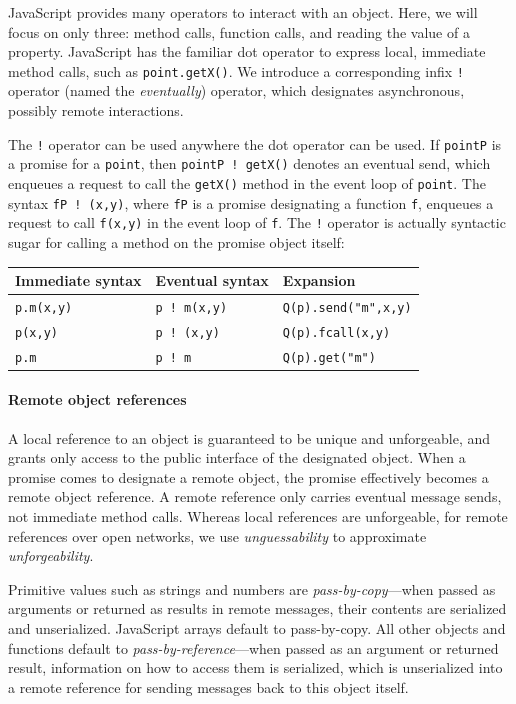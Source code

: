 \documentclass{llncs}
\begin{document}
JavaScript provides many operators to interact with an object. Here, we will focus on only three: method calls, function calls, and reading the value of a property. JavaScript has the familiar dot operator to express local, immediate method calls, such as {\tt point.getX()}. We introduce a corresponding infix {\tt !} operator (named the \emph{eventually}) operator, which designates asynchronous, possibly remote interactions.

The {\tt !} operator can be used anywhere the dot operator can be used. If {\tt pointP} is a promise for a {\tt point}, then {\tt pointP ! getX()} denotes an eventual send, which enqueues a request to call the {\tt getX()} method in the event loop of {\tt point}. The syntax {\tt fP ! (x,y)}, where {\tt fP} is a promise designating a function {\tt f}, enqueues a request to call {\tt f(x,y)} in the event loop of {\tt f}. The {\tt !} operator is actually syntactic sugar for calling a method on the promise object itself:

\begin{center}
  \begin{tabular}{ l | l | l }
  Immediate syntax & Eventual syntax & Expansion \\
  \hline
  {\tt p.m(x,y)} & {\tt p ! m(x,y)} & {\tt Q(p).send("m",x,y)} \\
  {\tt p(x,y)} & {\tt p ! (x,y)} & {\tt Q(p).fcall(x,y)}\\
  {\tt p.m} & {\tt p ! m} & {\tt Q(p).get("m")}\\
  \end{tabular} 
\end{center}


\paragraph{Remote object references}

A local reference to an object is guaranteed to be unique and unforgeable, and grants only access to the public interface of the designated object. When a promise comes to designate a remote object, the promise effectively becomes a remote object reference. A remote reference only carries eventual message sends, not immediate method calls. Whereas local references are unforgeable, for remote references over open networks, we use \emph{unguessability} to approximate \emph{unforgeability}.

Primitive values such as strings and numbers are \emph{pass-by-copy}---when passed as arguments or returned as results in remote messages, their contents are serialized and unserialized. JavaScript arrays default to pass-by-copy. All other objects and functions default to \emph{pass-by-reference}---when passed as an argument or returned result, information on how to access them is serialized, which is unserialized into a remote reference for sending messages back to this object itself.
\end{document}
